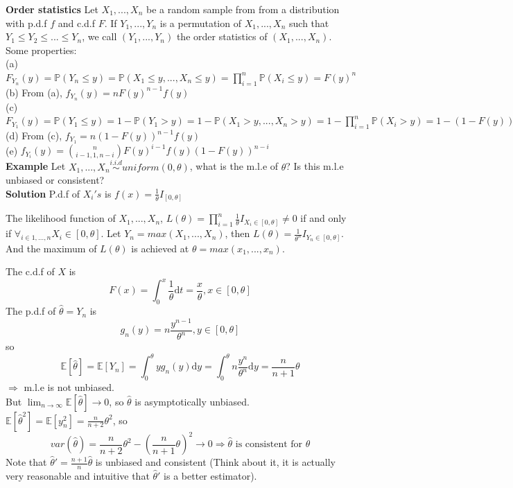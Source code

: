 \documentclass[a4paper,12pt]{article}
\begin{document}
\textbf{Order statistics}
Let $X_1, ..., X_n$ be a random sample from from a distribution with p.d.f $f$ and c.d.f $F$. If $Y_1, ..., Y_n$ is a permutation of $X_1, ..., X_n$ such that $Y_1 \leq Y_2 \leq ... \leq Y_n$, we call $(Y_1, ..., Y_n)$ the order statistics of $(X_1, ..., X_n)$.\\

Some properties:\\
(a) $F_{Y_n}(y) = \mathbb{P}( Y_n \leq y ) = \mathbb{P}(X_1 \leq y, ..., X_n \leq y) = \prod_{i=1}^n \mathbb{P}(X_i \leq y) = F(y)^n$\\
(b) From (a), $f_{Y_n} (y) = n F(y)^{n-1}f(y)$\\
(c) $F_{Y_1}(y) = \mathbb{P}( Y_1 \leq y ) = 1-\mathbb{P}( Y_1 > y ) = 1-\mathbb{P}(X_1 > y, ..., X_n > y) = 1-\prod_{i=1}^n \mathbb{P}(X_i > y) = 1-(1-F(y))^n$\\
(d) From (c), $f_{Y_1} = n(1-F(y))^{n-1}f(y)$\\
(e) $f_{Y_i}(y) = {n \choose i-1, 1, n-i} F(y)^{i-1}f(y)(1-F(y))^{n-i}$\\

\textbf{Example} Let $X_1, ..., X_n \overset{i.i.d}{\sim} uniform(0, \theta)$, what is the m.l.e of $\theta$? Is this m.l.e unbiased or consistent?\\

\textbf{Solution} P.d.f of $X_i's$ is $f(x) = \frac{1}{\theta} I_{[0, \theta]}$

The likelihood function of $X_1, ..., X_n$, $L(\theta) = \prod_{i=1}^n \frac{1}{\theta} I_{X_i \in [0, \theta]} \neq 0$ if and only if $\forall_{i\in 1, ..., n} X_i \in [0, \theta]$. Let $Y_n = max(X_1, ..., X_n)$, then $L(\theta) = \frac{1}{\theta^n}I_{Y_n \in [0, \theta]}$. And the maximum of $L(\theta)$ is achieved at $\theta = max(x_1, ..., x_n)$.

The c.d.f of $X$ is
$$F(x) = \int_0^x \frac{1}{\theta}\mathrm{d}t = \frac{x}{\theta}, x\in [0, \theta]$$
The p.d.f of $\hat{\theta} = Y_n$ is
$$g_n(y) = n\frac{y^{n-1}}{\theta^n}, y \in [0, \theta]$$
so
$$\mathbb{E}[ \hat{\theta} ] = \mathbb{E}[Y_n] = \int_0^\theta y g_n(y) \mathrm{d}y = \int_0^\theta n\frac{y^n}{\theta^n} \mathrm{d}y = \frac{n}{n+1}\theta$$
$\Rightarrow$ m.l.e is not unbiased.\\

But
$\lim_{n\to\infty} \mathbb{E}[\hat{\theta}] \to 0$, so $\hat{\theta}$ is asymptotically unbiased. $\mathbb{E}[\hat{\theta}^2] = \mathbb{E}[y_n^2] = \frac{n}{n+2}\theta^2$, so
$$var(\hat{\theta}) = \frac{n}{n+2}\theta^2 - (\frac{n}{n+1}\theta)^2  \to 0 \Rightarrow \hat{\theta}\text{ is consistent for } \theta$$
Note that $\hat{\theta}' = \frac{n+1}{n}\hat{\theta}$ is unbiased and consistent (Think about it, it is actually very reasonable and intuitive that $\hat{\theta}'$ is a better estimator).\\
\end{document}
